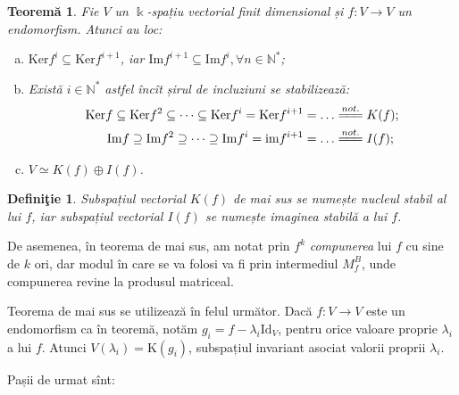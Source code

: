 \documentclass[11pt,a4paper]{article}
\newcommand\seq{\subseteq}
\newcommand\NN{\mathbb{N}}
\theoremstyle{dotless}
\newtheorem{theorem}{Teorem\u{a}}[section]
\theoremstyle{dotlessdr}
\newtheorem{definition}{Defini\c{t}ie}[section]
\begin{document}
\begin{theorem}\label{thm:jord}
  Fie $V$ un $\Bbbk$-spațiu vectorial finit dimensional și $f : V \to V$ un
  endomorfism. Atunci au loc:
  \begin{enumerate}[(a)]
  \item $\mathrm{Ker}f^i \seq \mathrm{Ker}f^{i + 1}$, iar
    $\mathrm{Im}f^{i+1} \seq \mathrm{Im}f^i, \forall n \in \NN^\ast$;
  \item Există $i \in \NN^\ast$ astfel încît șirul de incluziuni se stabilizează:
    \begin{align*}
      \mathrm{Ker}f \seq \mathrm{Ker}f^2 \seq \dots \seq \mathrm{Ker}f^i = \mathrm{Ker}f^{i+1}
      = \dots &\stackrel{not.}{=\joinrel=\joinrel=} K(f); \\
      \mathrm{Im}f \supseteq \mathrm{Im}f^2 \supseteq \dots \supseteq \mathrm{Im}f^i =
      \mathrm{im}f^{i+1} = \dots &\stackrel{not.}{=\joinrel=\joinrel=} I(f);
    \end{align*}
  \item $V \simeq K(f) \oplus I(f)$.
  \end{enumerate}
\end{theorem}

\begin{definition}\label{def:stabil}
  Subspațiul vectorial $K(f)$ de mai sus se numește \emph{nucleul stabil} al lui $f$, iar
  subspațiul vectorial $I(f)$ se numește \emph{imaginea stabilă} a lui $f$.
\end{definition}

De asemenea, în teorema de mai sus, am notat prin $f^k$ \emph{compunerea} lui $f$ cu sine
de $k$ ori, dar modul în care se va folosi va fi prin intermediul $M_f^B$, unde compunerea
revine la produsul matriceal.

Teorema de mai sus se utilizează în felul următor. Dacă $f : V \to V$ este un endomorfism
ca în teoremă, notăm $g_i = f - \lambda_i \mathrm{Id}_V$, pentru orice valoare proprie $\lambda_i$
a lui $f$. Atunci $V(\lambda_i) = \mathrm{K}(g_i)$, subspațiul invariant asociat valorii
proprii $\lambda_i$.

Pașii de urmat sînt:
\end{document}
